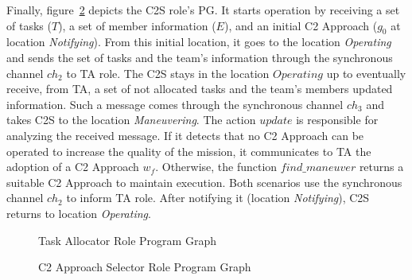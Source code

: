 Finally, figure~\ref{fig:C2S} depicts the C2S role's PG. It starts operation by receiving a set of tasks ($T$), a set of member information ($E$), and an initial C2 Approach ($g_0$ at location \textit{Notifying}). From this initial location, it goes to the location \textit{Operating} and sends the set of tasks and the team's information through the synchronous channel $ch_2$ to TA role. The C2S stays in the location $Operating$ up to eventually receive, from TA, a set of not allocated tasks and the team's members updated information. Such a message comes through the synchronous channel $ch_3$ and takes C2S to the location \textit{Maneuvering}. The action $update$ is responsible for analyzing the received message. If it detects that no C2 Approach can be operated to increase the quality of the mission, it communicates to TA the adoption of a C2 Approach $w_f$. Otherwise, the function $find\_maneuver$ returns a suitable C2 Approach to maintain execution. Both scenarios use the synchronous channel $ch_2$ to inform TA role. After notifying it (location \textit{Notifying}), C2S returns to location \textit{Operating}.

\begin{figure}[!ht]
    \centering
    \scalebox{.65}{}
    \caption{Task Allocator Role Program Graph}
    \label{fig:TA}
\end{figure}

\begin{figure}[!ht]
    \centering
    \scalebox{.65}{}
    \caption{C2 Approach Selector Role Program Graph}
    \label{fig:C2S}
\end{figure}

